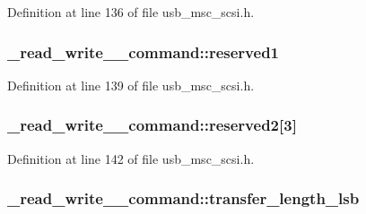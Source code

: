 Definition at line 136 of file usb\+\_\+msc\+\_\+scsi.\+h.

\subsubsection[{\texorpdfstring{reserved1}{reserved1}}]{ \+\_\+read\+\_\+write\+\_\+\_\+command\+::reserved1}\hypertarget{struct__read__write__10__command_af79f0a3d1a8908e4e17ee47a7a121876}{}\label{struct__read__write__10__command_af79f0a3d1a8908e4e17ee47a7a121876}


Definition at line 139 of file usb\+\_\+msc\+\_\+scsi.\+h.

\subsubsection[{\texorpdfstring{reserved2}{reserved2}}]{ \+\_\+read\+\_\+write\+\_\+\_\+command\+::reserved2\mbox{[}3\mbox{]}}\hypertarget{struct__read__write__10__command_a8618e238961a8c76603b6d3ece4e49c6}{}\label{struct__read__write__10__command_a8618e238961a8c76603b6d3ece4e49c6}


Definition at line 142 of file usb\+\_\+msc\+\_\+scsi.\+h.

\subsubsection[{\texorpdfstring{transfer\+\_\+length\+\_\+lsb}{transfer_length_lsb}}]{ \+\_\+read\+\_\+write\+\_\+\_\+command\+::transfer\+\_\+length\+\_\+lsb}\hypertarget{struct__read__write__10__command_a53389ce2784140f7ee172cf043aa6048}{}\label{struct__read__write__10__command_a53389ce2784140f7ee172cf043aa6048}


